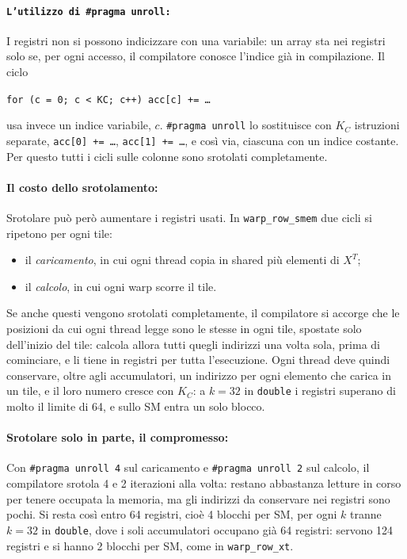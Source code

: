 \documentclass[11pt,a4paper]{article}
\begin{document}
\paragraph{\texttt{L'utilizzo di \#pragma unroll:}} I registri non si possono
indicizzare con una variabile: un array sta nei registri solo se, per ogni
accesso, il compilatore conosce l'indice già in compilazione. Il ciclo
\begin{center}
  \texttt{for (c = 0; c < KC; c++) acc[c] += \dots}
\end{center}
usa invece un indice variabile, $c$. \texttt{\#pragma unroll} lo sostituisce
con $K_C$ istruzioni separate, \texttt{acc[0] += \dots},
\texttt{acc[1] += \dots}, e così via, ciascuna con un indice costante. Per
questo tutti i cicli sulle colonne sono srotolati completamente.

\paragraph{Il costo dello srotolamento:} Srotolare può però
aumentare i registri usati. In \texttt{warp\_row\_smem} due cicli si ripetono
per ogni tile:
\begin{itemize}
  \item il \emph{caricamento}, in cui ogni thread copia in shared più elementi
        di $X^T$;
  \item il \emph{calcolo}, in cui ogni warp scorre il tile.
\end{itemize}
Se anche questi vengono srotolati completamente, il compilatore si accorge che
le posizioni da cui ogni thread legge sono le stesse in ogni tile, spostate
solo dell'inizio del tile: calcola allora tutti quegli indirizzi una volta
sola, prima di cominciare, e li tiene in registri per tutta l'esecuzione. Ogni
thread deve quindi conservare, oltre agli accumulatori, un indirizzo per ogni
elemento che carica in un tile, e il loro numero cresce con $K_C$: a $k = 32$
in \texttt{double} i registri superano di molto il limite di 64, e sullo SM
entra un solo blocco.

\paragraph{Srotolare solo in parte, il compromesso:} Con
\texttt{\#pragma unroll 4} sul caricamento e \texttt{\#pragma unroll 2} sul
calcolo, il compilatore srotola 4 e 2 iterazioni alla volta: restano
abbastanza letture in corso per tenere occupata la memoria, ma gli indirizzi
da conservare nei registri sono pochi. Si resta così entro 64 registri, cioè 4
blocchi per SM, per ogni $k$ tranne $k = 32$ in \texttt{double}, dove i soli
accumulatori occupano già 64 registri: servono 124 registri e si hanno 2
blocchi per SM, come in \texttt{warp\_row\_xt}.
\end{document}
